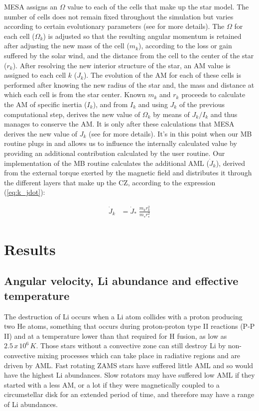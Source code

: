 \documentclass[fleqn,usenatbib]{mnras}
\begin{document}
MESA assigns an $\Omega$ value to each of the cells that make up the star model. The number of cells does not remain fixed throughout the simulation but varies according to certain evolutionary parameters (see \citet{Paxton2015} for more details). The $\Omega$ for each cell ($\Omega_k$) is adjusted so that the resulting angular momentum is retained after adjusting the new mass of the cell ($m_k$), according to the loss or gain suffered by the solar wind, and the distance from the cell to the center of the star ($r_k$). After resolving the new interior structure of the star, an AM value is assigned to each cell $k$ ($J_k$). The evolution of the AM for each of these cells is performed after knowing the new radius of the star and, the mass and distance at which each cell is from the star center. Known $m_k$ and $r_k$ proceeds to calculate the AM of specific inertia ($I_k$), and from $I_k$ and using $J_k$ of the previous computational step, derives the new value of $\Omega_k$ by means of $J_k/I_k$ and thus manages to conserve the AM. It is only after these calculations that MESA derives the new value of $J_k$ (see \citet{Paxton2015} for more details). It's in this point when our MB routine plugs in and allows us to influence the internally calculated value by providing an additional contribution calculated by the user routine. Our implementation of the MB routine calculates the additional AML ($\Dot{J}_{k}$), derived from the external torque exerted by the magnetic field and distributes it through the different layers that make up the CZ, according to the expression (\ref{eq:k_jdot}):\par

\begin{ceqn}
\begin{align}
\Dot{J}_{k} &= \Dot{J}_*\;\frac{m^{}_{k} r^2_{k}}{m^{}_* r_*^2} \label{eq:k_jdot}
\end{align}
\end{ceqn}

\section{Results}
\subsection{Angular velocity, Li abundance and effective temperature}
The destruction of Li occurs when a Li atom collides with a proton producing two He atoms, something that occurs during proton-proton type II reactions (P-P II) and at a temperature lower than that required for H fusion, as low as $2.5\, x\, 10^6\, K$. Those stars without a convective zone can still destroy Li by non-convective mixing processes which can take place in radiative regions and are driven by AML. Fast rotating ZAMS stars have suffered little AML and so would have the highest Li abundances. Slow rotators may have suffered low AML if they started with a less AM, or a lot if they were magnetically coupled to a circumstellar disk for an extended period of time, and therefore may have a range of Li abundances. \par
\end{document}
